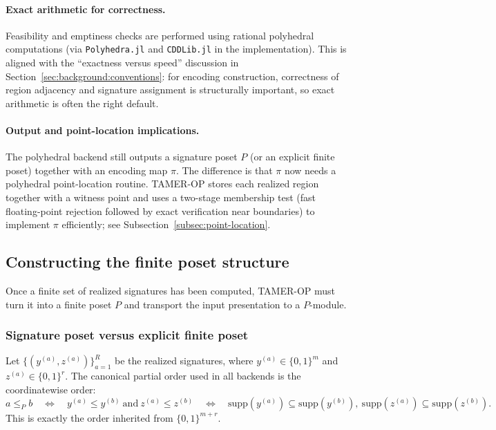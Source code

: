 \documentclass{article}
\newcommand{\<}{\langle}
\renewcommand{\>}{\rangle}
\theoremstyle{definition}
\theoremstyle{remark}
\begin{document}
	\paragraph{Exact arithmetic for correctness.}
	Feasibility and emptiness checks are performed using rational polyhedral computations
	(via \texttt{Polyhedra.jl} and \texttt{CDDLib.jl} in the implementation).
	This is aligned with the ``exactness versus speed'' discussion in
	Section~\ref{sec:background:conventions}: for encoding construction, correctness of
	region adjacency and signature assignment is structurally important, so exact arithmetic
	is often the right default.
	
	\paragraph{Output and point-location implications.}
	The polyhedral backend still outputs a signature poset $P$ (or an explicit finite
	poset) together with an encoding map $\pi$.  The difference is that $\pi$ now needs a
	polyhedral point-location routine.  TAMER-OP stores each realized region together with
	a witness point and uses a two-stage membership test (fast floating-point rejection
	followed by exact verification near boundaries) to implement $\pi$ efficiently; see
	Subsection~\ref{subsec:point-location}.
	
	\subsection{Constructing the finite poset structure}
	\label{subsec:constructing-poset}
	
	Once a finite set of realized signatures has been computed, TAMER-OP must turn it
	into a finite poset $P$ and transport the input presentation to a $P$-module.
	
	\subsubsection*{Signature poset versus explicit finite poset}
	
	Let $\{(y^{(a)},z^{(a)})\}_{a=1}^R$ be the realized signatures, where
	$y^{(a)}\in\{0,1\}^m$ and $z^{(a)}\in\{0,1\}^r$.  The canonical partial order used in
	all backends is the coordinatewise order:
	\[
	a \le_P b
	\quad\Longleftrightarrow\quad
	y^{(a)} \le y^{(b)}\ \text{and}\ z^{(a)} \le z^{(b)}
	\quad\Longleftrightarrow\quad
	\mathrm{supp}(y^{(a)})\subseteq \mathrm{supp}(y^{(b)}),\ 
	\mathrm{supp}(z^{(a)})\subseteq \mathrm{supp}(z^{(b)}).
	\]
	This is exactly the order inherited from $\{0,1\}^{m+r}$.
	
\end{document}
